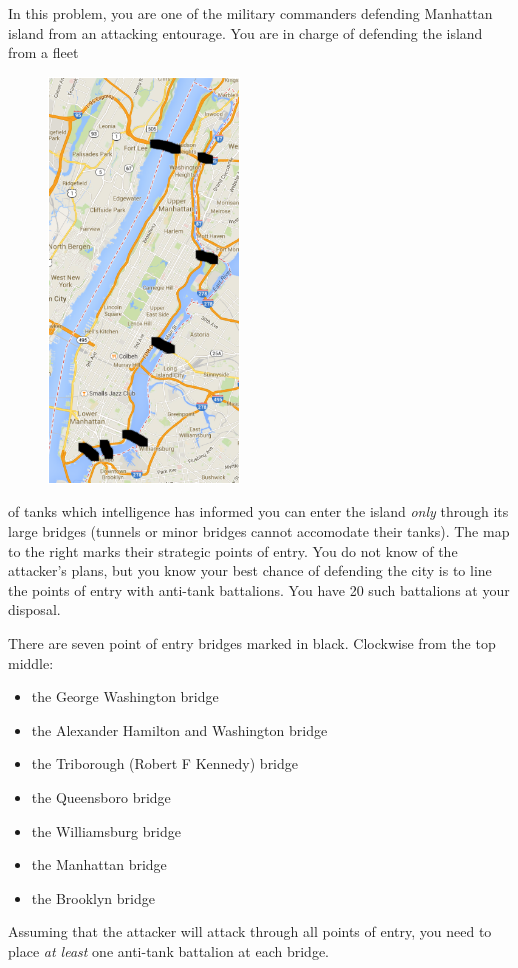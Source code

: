 \documentclass[12pt]{article}
\begin{document}
\problem In this problem, you are one of the military commanders defending Manhattan island from an attacking entourage. You are in charge of defending the island from a fleet \begin{figure}
\vspace{-1cm}
  \begin{center}
    \includegraphics[width=2in]{manhattan.png}
  \end{center}
\vspace{-1.6cm}
\end{figure}   of tanks which intelligence has informed you can enter the island \textit{only }through its large bridges (tunnels or minor bridges cannot accomodate their tanks). The map to the right marks their strategic points of entry. You do not know of the attacker's plans, but you know your best chance of defending the city is to line the points of entry with anti-tank battalions. You have 20 such battalions at your disposal.

There are seven point of entry bridges marked in black. Clockwise from the top middle:
\vspace{-0.25cm}
\begin{itemize}
\setlength{\itemsep}{-6pt}
\item the George Washington bridge
\item the Alexander Hamilton and Washington bridge
\item the Triborough (Robert F Kennedy) bridge
\item the Queensboro bridge
\item the Williamsburg bridge
\item the Manhattan bridge
\item the Brooklyn bridge
\end{itemize}
\vspace{-0.25cm}
Assuming that the attacker will attack through all points of entry, you need to place \textit{at least} one anti-tank battalion at each bridge. \\ \vspace{0.4cm}
\end{document}
